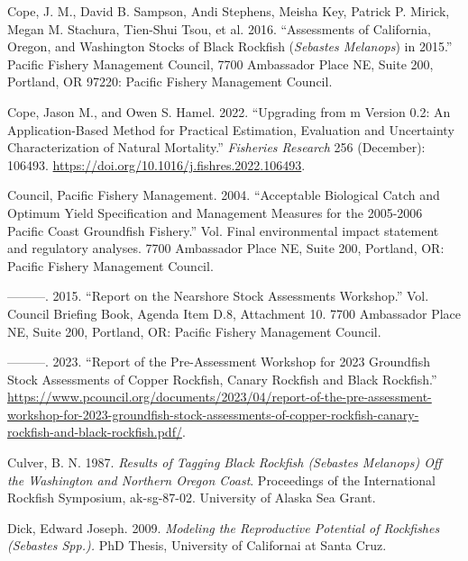 \documentclass[11pt,
  english,
  letterpaper,
]{article}
\newlength{\cslhangindent}
\newenvironment{CSLReferences}[2] %
 {%
  \setlength{\parindent}{0pt}
  \ifodd #1 \everypar{\setlength{\hangindent}{\cslhangindent}}\ignorespaces\fi
  \ifnum #2 > 0
  \setlength{\parskip}{#2\baselineskip}
  \fi
 }%
 {}
\begin{document}
\begin{CSLReferences}{1}{0}
\leavevmode{}%
Cope, J. M., David B. Sampson, Andi Stephens, Meisha Key, Patrick P. Mirick, Megan M. Stachura, Tien-Shui Tsou, et al. 2016. {``Assessments of {California}, {Oregon}, and {Washington} Stocks of Black Rockfish (\emph{{Sebastes} Melanops}) in 2015.''} Pacific Fishery Management Council, 7700 Ambassador Place NE, Suite 200, Portland, OR 97220: Pacific Fishery Management Council.

\leavevmode{}%
Cope, Jason M., and Owen S. Hamel. 2022. {``Upgrading from m Version 0.2: An Application-Based Method for Practical Estimation, Evaluation and Uncertainty Characterization of Natural Mortality.''} \emph{Fisheries Research} 256 (December): 106493. \url{https://doi.org/10.1016/j.fishres.2022.106493}.

\leavevmode{}%
Council, Pacific Fishery Management. 2004. {``Acceptable Biological Catch and Optimum Yield Specification and Management Measures for the 2005-2006 Pacific Coast Groundfish Fishery.''} Vol. Final environmental impact statement and regulatory analyses. 7700 Ambassador Place NE, Suite 200, Portland, OR: Pacific Fishery Management Council.

\leavevmode{}%
---------. 2015. {``Report on the Nearshore Stock Assessments Workshop.''} Vol. Council Briefing Book, Agenda Item D.8, Attachment 10. 7700 Ambassador Place NE, Suite 200, Portland, OR: Pacific Fishery Management Council.

\leavevmode{}%
---------. 2023. {``Report of the Pre-Assessment Workshop for 2023 Groundfish Stock Assessments of Copper Rockfish, Canary Rockfish and Black Rockfish.''} \url{https://www.pcouncil.org/documents/2023/04/report-of-the-pre-assessment-workshop-for-2023-groundfish-stock-assessments-of-copper-rockfish-canary-rockfish-and-black-rockfish.pdf/}.

\leavevmode{}%
Culver, B. N. 1987. \emph{Results of Tagging Black Rockfish (Sebastes Melanops) Off the Washington and Northern Oregon Coast}. Proceedings of the International Rockfish Symposium, ak-sg-87-02. University of Alaska Sea Grant.

\leavevmode{}%
Dick, Edward Joseph. 2009. \emph{Modeling the {Reproductive} {Potential} of {Rockfishes} (\emph{Sebastes} {Spp}.).} PhD Thesis, University of Californai at Santa Cruz.


\end{CSLReferences}
\end{document}
